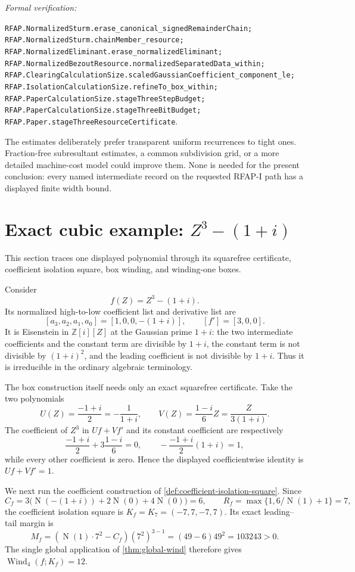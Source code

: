 \documentclass[11pt]{article}
\newcommand{\Zi}{\mathbb{Z}[i]}
\newcommand{\Norm}[1]{\operatorname{N}\!\left(#1\right)}
\newcommand{\Wind}{\operatorname{Wind}}
\newcommand{\leanref}[1]{\par\smallskip\noindent
  \emph{Formal verification:}\par\nobreak
  {\raggedright\nolinkurl{#1}.\par}}
\begin{document}
\leanref{RFAP.NormalizedSturm.erase_canonical_signedRemainderChain;
RFAP.NormalizedSturm.chainMember_resource;
RFAP.NormalizedEliminant.erase_normalizedEliminant;
RFAP.NormalizedBezoutResource.normalizedSeparatedData_within;
RFAP.ClearingCalculationSize.scaledGaussianCoefficient_component_le;
RFAP.IsolationCalculationSize.refineTo_box_within;
RFAP.PaperCalculationSize.stageThreeStepBudget;
RFAP.PaperCalculationSize.stageThreeBitBudget;
RFAP.Paper.stageThreeResourceCertificate}

The estimates deliberately prefer transparent uniform recurrences to tight
ones.  Fraction-free subresultant estimates, a common subdivision grid, or a
more detailed machine-cost model could improve them.  None is needed for the
present conclusion: every named intermediate record on the requested RFAP-I
path has a displayed finite width bound.

\section{Exact cubic example: \texorpdfstring{$Z^3-(1+i)$}{Z cubed minus (1+i)}}

This section traces one displayed polynomial through its squarefree
certificate, coefficient isolation square, box winding, and winding-one
boxes.

Consider
\[
            f(Z)=Z^3-(1+i).
\]
Its normalized high-to-low coefficient list and derivative list are
\[
 [a_3,a_2,a_1,a_0]=[1,0,0,-(1+i)],\qquad
 [f']=[3,0,0].
\]
It is Eisenstein in $\Zi[Z]$ at the Gaussian prime $1+i$: the two
intermediate coefficients and the constant term are divisible by $1+i$,
the constant term is not divisible by $(1+i)^2$, and the leading coefficient
is not divisible by $1+i$.  Thus it is irreducible in the ordinary algebraic
terminology.

The box construction itself needs only an exact squarefree certificate.  Take
the two polynomials
\[
 U(Z)=\frac{-1+i}{2}=-\frac1{1+i},\qquad
 V(Z)=\frac{1-i}{6}Z=\frac{Z}{3(1+i)}.
\]
The coefficient of $Z^3$ in $Uf+Vf'$ and its constant coefficient are
respectively
\[
 \frac{-1+i}{2}+3\frac{1-i}{6}=0,
 \qquad
 -\frac{-1+i}{2}(1+i)=1,
\]
while every other coefficient is zero.  Hence the displayed coefficientwise
identity is $Uf+Vf'=1$.

We next run the coefficient construction of
\cref{def:coefficient-isolation-square}.  Since
\[
 C_f=3\bigl(\Norm{-(1+i)}+2\Norm0+4\Norm0\bigr)=6,
 \qquad
 R_f=\max\{1,6/\Norm1+1\}=7,
\]
the coefficient isolation square is $K_f=K_7=(-7,7,-7,7)$.  Its exact
leading--tail margin is
\[
 M_f=(\Norm1\cdot7^2-C_f)(7^2)^{3-1}
     =(49-6)49^2=103243>0.
\]
The single global application of \cref{thm:global-wind} therefore gives
$\Wind_4(f;K_f)=12$.
\end{document}

